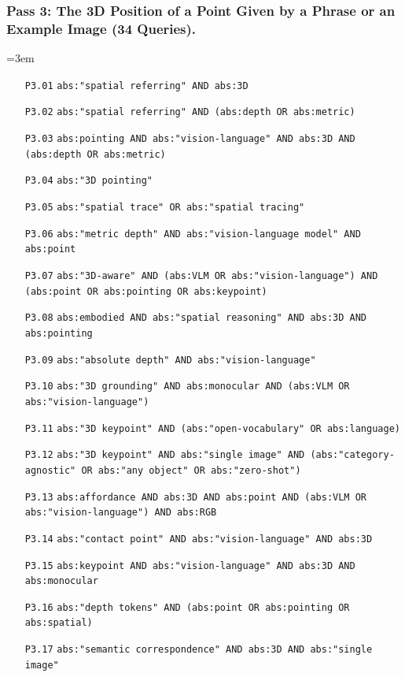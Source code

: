 \subsubsection{Pass 3: The 3D Position of a Point Given by a Phrase or an Example Image (34 Queries).}
{\footnotesize\raggedright\emergencystretch=3em\begin{itemize}\setlength{\itemsep}{0pt}\setlength{\parskip}{0pt}
\item[\texttt{P3.01}] \texttt{abs:"spatial referring" AND abs:3D}
\item[\texttt{P3.02}] \texttt{abs:"spatial referring" AND (abs:depth OR abs:metric)}
\item[\texttt{P3.03}] \texttt{abs:pointing AND abs:"vision-language" AND abs:3D AND (abs:depth OR abs:metric)}
\item[\texttt{P3.04}] \texttt{abs:"3D pointing"}
\item[\texttt{P3.05}] \texttt{abs:"spatial trace" OR abs:"spatial tracing"}
\item[\texttt{P3.06}] \texttt{abs:"metric depth" AND abs:"vision-language model" AND abs:point}
\item[\texttt{P3.07}] \texttt{abs:"3D-aware" AND (abs:VLM OR abs:"vision-language") AND (abs:point OR abs:pointing OR abs:keypoint)}
\item[\texttt{P3.08}] \texttt{abs:embodied AND abs:"spatial reasoning" AND abs:3D AND abs:pointing}
\item[\texttt{P3.09}] \texttt{abs:"absolute depth" AND abs:"vision-language"}
\item[\texttt{P3.10}] \texttt{abs:"3D grounding" AND abs:monocular AND (abs:VLM OR abs:"vision-language")}
\item[\texttt{P3.11}] \texttt{abs:"3D keypoint" AND (abs:"open-vocabulary" OR abs:language)}
\item[\texttt{P3.12}] \texttt{abs:"3D keypoint" AND abs:"single image" AND (abs:"category-agnostic" OR abs:"any object" OR abs:"zero-shot")}
\item[\texttt{P3.13}] \texttt{abs:affordance AND abs:3D AND abs:point AND (abs:VLM OR abs:"vision-language") AND abs:RGB}
\item[\texttt{P3.14}] \texttt{abs:"contact point" AND abs:"vision-language" AND abs:3D}
\item[\texttt{P3.15}] \texttt{abs:keypoint AND abs:"vision-language" AND abs:3D AND abs:monocular}
\item[\texttt{P3.16}] \texttt{abs:"depth tokens" AND (abs:point OR abs:pointing OR abs:spatial)}
\item[\texttt{P3.17}] \texttt{abs:"semantic correspondence" AND abs:3D AND abs:"single image"}

\end{itemize}}
